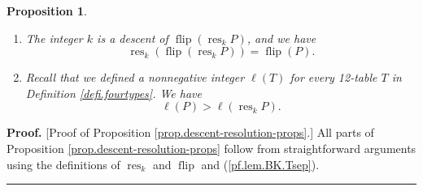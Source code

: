 \documentclass[12pt]{article}
\theoremstyle{plain}
\newtheorem{proposition}[theorem]{Proposition}
\theoremstyle{definition}
\newenvironment{proof}[1][Proof]{\noindent\textbf{#1.} }{\ \rule{0.5em}{0.5em}}
\def\lm{{\lambda/\mu}}
\begin{document}
\begin{proposition}
\begin{enumerate}

\item \label{pf.lem.BK.res.flip}
The integer $k$ is a descent of $\operatorname*{flip}\left(  \operatorname*{res}%
\nolimits_{k}P\right)$, and we have
\[
\operatorname*{res}%
\nolimits_{k}\left(  \operatorname*{flip}\left(  \operatorname*{res}%
\nolimits_{k}P\right)  \right) = \operatorname*{flip}\left(  P\right).
\]

\item \label{pf.lem.BK.res.lendec}
Recall that we defined a nonnegative integer $\ell\left(
T\right)  $ for every 12-table $T$ in Definition \ref{defi.fourtypes}. We
have
\[
\ell\left(  P\right)  >\ell\left(  \operatorname*{res}\nolimits_{k}P\right)  .
\]

\end{enumerate}

\end{proposition}

\begin{proof}
[Proof of Proposition \ref{prop.descent-resolution-props}.]
All parts of Proposition \ref{prop.descent-resolution-props} follow from straightforward arguments
using the definitions of $\operatorname*{res}_{k}$ and $\operatorname*{flip}$
and (\ref{pf.lem.BK.Tsep}).
\end{proof}


\end{document}

